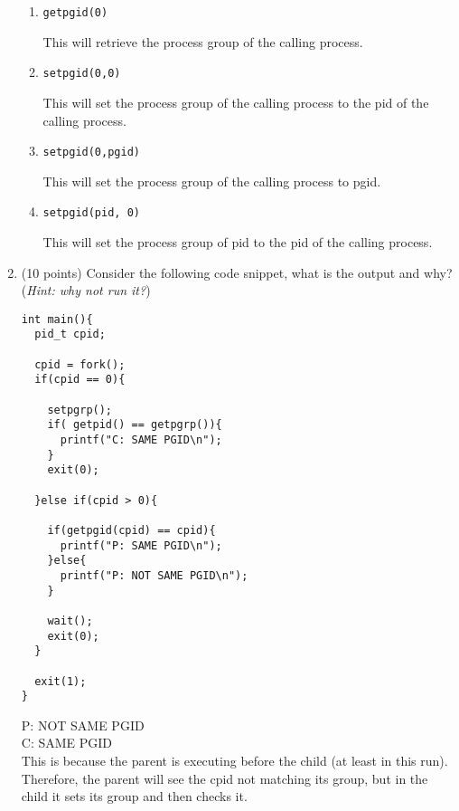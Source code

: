 \documentclass{article}[9pt]
\newenvironment{answerfont}{\fontfamily{qhv}\selectfont}{\par}
\newenvironment{myanswer}{\begin{mdframed}\begin{answerfont}}{\end{answerfont}\end{mdframed}}
\begin{document}
\begin{enumerate}
\begin{enumerate}
\item \texttt{getpgid(0)}

  \begin{myanswer}
    This will retrieve the process group of the calling process.
  \end{myanswer}

\item \texttt{setpgid(0,0)}

  \begin{myanswer}
    This will set the process group of the calling process to the pid of
    the calling process.
  \end{myanswer}

\item \texttt{setpgid(0,pgid)}

  \begin{myanswer}
    This will set the process group of the calling process to pgid.
  \end{myanswer}

\item \texttt{setpgid(pid, 0)}

  \begin{myanswer}
    This will set the process group of pid to the pid of the calling
    process.
  \end{myanswer}

\end{enumerate}

\item (10 points) Consider the following code snippet, what is the output and why?
(\emph{Hint: why not run it?})

\begin{verbatim}
int main(){
  pid_t cpid;

  cpid = fork();
  if(cpid == 0){

    setpgrp();
    if( getpid() == getpgrp()){
      printf("C: SAME PGID\n");
    }
    exit(0);

  }else if(cpid > 0){

    if(getpgid(cpid) == cpid){
      printf("P: SAME PGID\n");
    }else{
      printf("P: NOT SAME PGID\n");
    }

    wait();
    exit(0);
  }

  exit(1);
}
\end{verbatim}

  \begin{myanswer}
    P: NOT SAME PGID\\
    C: SAME PGID\\
    This is because the parent is executing before the child (at least
    in this run).  Therefore, the parent will see the cpid not matching
    its group, but in the child it sets its group and then checks it.
  \end{myanswer}



\end{enumerate}
\end{document}
